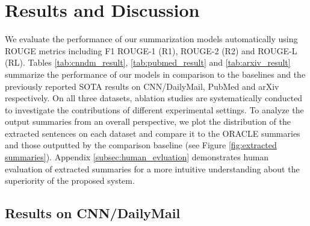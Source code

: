 \documentclass[11pt]{article}
\begin{document}
\section{Results and Discussion}
\label{sec:Results and Discussion}
We evaluate the performance of our summarization models automatically using ROUGE metrics \cite{rouge} including F1 ROUGE-1 (R1), ROUGE-2 (R2) and ROUGE-L (RL). Tables \ref{tab:cnndm_result}, \ref{tab:pubmed_result} and \ref{tab:arxiv_result} summarize the performance of our models in comparison to the baselines and the previously reported SOTA results on CNN/DailyMail, PubMed and arXiv respectively. On all three datasets, ablation studies are systematically conducted to investigate the contributions of different experimental settings. To analyze the output summaries from an overall perspective, we plot the distribution of the extracted sentences on each dataset and compare it to the ORACLE summaries and those outputted by the comparison baseline (see Figure \ref{fig:extracted summaries}). Appendix \ref{subsec:human_evluation} demonstrates human evaluation of extracted summaries for a more intuitive understanding about the superiority of the proposed system.

\subsection{Results on CNN/DailyMail}
\label{subsec:Results on short documents}
\end{document}
